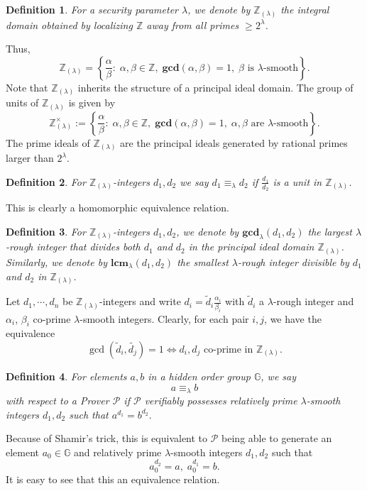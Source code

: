 \documentclass[11pt, lettersize, notitlepage, leqno, footskip=0.6cm]{article}
\newcommand{\bz}{\mathbb Z}
\newcommand{\LRA}{\Longleftrightarrow}
\newcommand{\eqlam}{\equiv_{\lam}}
\newcommand{\wti}{\widetilde}
\newcommand{\mc}{\mathcal}
\newcommand{\mb}{\mathbb}
\newcommand{\mbf}{\mathbf}
\newcommand{\al}{\alpha}
\newcommand{\be}{\beta}
\newcommand{\lam}{\lambda}
\newcommand{\lamb}{\lambda}
\newcommand{\bzlam}{\bz_{(\lam)}}
\newcommand{\vs}{\vspace{-0.15cm}}
\newcommand{\noin}{\noindent}
\newcommand{\LCM}{\mbf{lcm}}
\newcommand{\GCD}{\mbf{gcd}}
\newtheorem{Def}{Definition}[section]
\numberwithin{equation}{section}
\begin{document}
\begin{Def} For a security parameter $\lamb$, we denote by $\bz_{(\lamb)}$ the integral domain obtained by localizing $\bz$ away from all primes $\geq 2^{\lamb}$. \end{Def}

\noindent Thus, \vs $$\bz_{(\lamb)} = \left\{\frac{\al}{\be}:\; \al,\be\in\bz,\;\GCD(\al,\be) = 1,\; \be \text{ is } \lamb\text{-smooth}\right\}.$$ Note that $\bz_{(\lamb)}$ inherits the structure of a principal ideal domain. The group of units of $\bzlam$ is given by $$\bzlam^{\times} := \left\{\frac{\al}{\be}:\; \al,\be\in\bz,\;\GCD(\al,\be) = 1,\; \al, \be \text{ are } \lamb\text{-smooth}\right\}. $$ The prime ideals of $\bz_{(\lamb)}$ are the principal ideals generated by rational primes larger than $2^{\lamb}$.

\begin{Def} For $\bzlam$-integers $d_1,d_2$ we say $d_1\eqlam d_2$ if $\frac{d_1}{d_2}$ is a unit in $\bzlam$.\end{Def}

\noin This is clearly a homomorphic equivalence relation.

\begin{Def} For $\bzlam$-integers $d_1,d_2$, we denote by $\GCD_{\lam}(d_1,d_2)$ the largest $\lam$-rough integer that divides both $d_1$ and $d_2$ in the principal ideal domain $\bzlam$. Similarly, we denote by $\LCM_{\lam}(d_1,d_2)$ the smallest $\lam$-rough integer divisible by $d_1$ and $d_2$ in $\bzlam$.\end{Def}

\noin Let $d_1,\cdots,d_n$ be $\bzlam$-integers and write $d_i = \wti{d}_i\frac{\al_i}{\be_i}$ with $\wti{d}_i$ a $\lam$-rough integer and $\al_i$, $\be_i$ co-prime $\lam$-smooth integers. Clearly, for each pair $i,j$, we have the equivalence \vs $$\gcd(\wti{d}_i,\wti{d_j}) = 1\LRA d_i,d_j\text{ co-prime in }\bzlam. $$

\begin{Def} For elements $a, b$ in a hidden order group $\mb{G}$, we say \vs $$ a \equiv_{\lam} b$$ with respect to a Prover $\mc{P}$ if $\mc{P}$ verifiably possesses  relatively prime $\lamb$-smooth integers $d_1, d_2$ such that $a^{d_1} = b^{d_2}.$\end{Def}

\noindent Because of Shamir's trick, this is equivalent to $\mc{P}$ being able to generate an element $a_0\in \mb{G}$ and relatively prime $\lamb$-smooth integers $d_1, d_2$ such that \vs $$a_0^{d_2} = a, \; a_0^{d_1} = b.$$ It is easy to see that this an equivalence relation.
\end{document}
